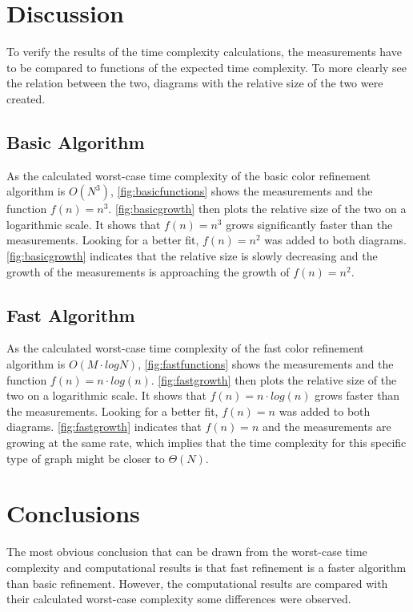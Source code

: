 \documentclass[twoside]{article}
\begin{document}
\begin{multicols}{2}
\section{Discussion} %
\label{disc}
To verify the results of the time complexity calculations, the measurements have to be compared to functions of the expected time complexity. To more clearly see the relation between the two, diagrams with the relative size of the two were created.

\subsection{Basic Algorithm}
As the calculated worst-case time complexity of the basic color refinement algorithm is $O(N^3)$, \autoref{fig:basicfunctions} shows the measurements and the function $f(n)=n^3$. \autoref{fig:basicgrowth} then plots the relative size of the two on a logarithmic scale. It shows that $f(n)=n^3$ grows significantly faster than the measurements. Looking for a better fit, $f(n)=n^2$ was added to both diagrams. \autoref{fig:basicgrowth} indicates that the relative size is slowly decreasing and the growth of the measurements is approaching the growth of $f(n)=n^2$.

\subsection{Fast Algorithm}
As the calculated worst-case time complexity of the fast color refinement algorithm is $O(M\cdot{}logN)$, \autoref{fig:fastfunctions} shows the measurements and the function $f(n)=n\cdot{}log(n)$. \autoref{fig:fastgrowth} then plots the relative size of the two on a logarithmic scale. It shows that $f(n)=n\cdot{}log(n)$ grows faster than the measurements. Looking for a better fit, $f(n)=n$ was added to both diagrams. \autoref{fig:fastgrowth} indicates that $f(n)=n$ and the measurements are growing at the same rate, which implies that the time complexity for this specific type of graph might be closer to $\Theta(N)$.

\section{Conclusions}
\label{concl}
The most obvious conclusion that can be drawn from the worst-case time complexity and computational results is that fast refinement is a faster algorithm than basic refinement. However, the computational results are compared with their calculated worst-case complexity some differences were observed.


\end{multicols}
\end{document}
